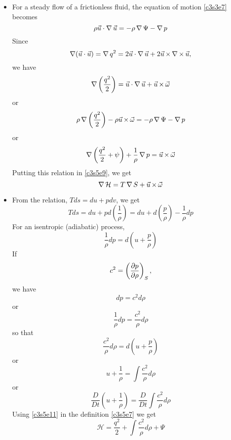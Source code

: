 \begin{itemize}
\item For a steady flow of a frictionless fluid, the equation of motion \eqref{c3s3e7} becomes
\[
\rho\vec{u}\cdot\operatorname{\nabla}\vec{u} = -\rho\operatorname{\nabla}\Psi - \operatorname{\nabla} p
\]
Since
\[
\operatorname{\nabla}(\vec{u}\cdot\vec{u}) = \operatorname{\nabla}{q^2} = 2\vec{u}\cdot\operatorname{\nabla}\vec{u} + 2\vec{u}\operatorname{\times}\operatorname{\nabla\operatorname{\times}}\vec{u},
\]
we have
\[
\operatorname{\nabla}\left(\frac{q^2}{2}\right) = \vec{u}\cdot\operatorname{\nabla}\vec{u} + \vec{u}\operatorname{\times}\vec{\omega}
\]
or
\[
\rho\operatorname{\nabla}\left(\frac{q^2}{2}\right) - \rho\vec{u}\operatorname{\times}\vec{\omega} = -\rho\operatorname{\nabla}\Psi - \operatorname{\nabla} p
\]
or
\[
\operatorname{\nabla}\left(\frac{q^2}{2} + \psi\right)  + \frac{1}{\rho}\operatorname{\nabla} p = \vec{u}\operatorname{\times}\vec{\omega}
\]
Putting this relation in \eqref{c3s5e9}, we get
\begin{equation}\label{c3s5e10}
\operatorname{\nabla}\mathcal{H} = T\operatorname{\nabla} S + \vec{u}\operatorname{\times}\vec{\omega}
\end{equation}

\item From the relation, $Tds = du + pdv$, we get
\[
Tds = du + pd\left(\frac{1}{\rho}\right) = du + d\left(\frac{p}{\rho}\right) - \frac{1}{\rho}dp
\]
For an isentropic (adiabatic) process,
\[
\frac{1}{\rho}dp = d\left(u + \frac{p}{\rho}\right)
\]
If 
\[
c^2 = \left(\frac{\partial{p}}{\partial{\rho}}\right)_S,
\]
we have
\[
dp = c^2d\rho
\]
or
\[
\frac{1}{\rho}dp = \frac{c^2}{\rho}d\rho
\]
so that
\[
\frac{c^2}{\rho}d\rho = d\left(u + \frac{p}{\rho}\right) 
\]
or
\begin{equation}\label{c3s5e11}
u + \frac{1}{\rho} = \int\frac{c^2}{\rho}d\rho
\end{equation}
or
\begin{equation}\label{c3s5e12}
\frac{D}{Dt}\left(u + \frac{1}{\rho}\right) = \frac{D}{Dt}\int\frac{c^2}{\rho}d\rho
\end{equation}
Using \eqref{c3s5e11} in the definition \eqref{c3s5e7} we get
\begin{equation}\label{c3s5e13}
\mathcal{H} = \frac{q^2}{2} + \int\frac{c^2}{\rho}d\rho + \Psi
\end{equation}


\end{itemize}
